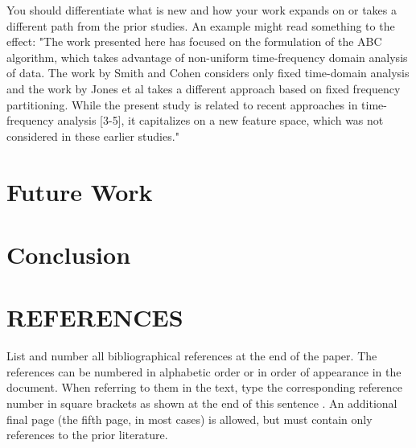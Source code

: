 \documentclass{article}
\begin{document}
You should differentiate what is new and how your work expands on
or takes a different path from the prior studies. An example might
read something to the effect: "The work presented here has focused
on the formulation of the ABC algorithm, which takes advantage of
non-uniform time-frequency domain analysis of data. The work by
Smith and Cohen considers only fixed time-domain analysis and
the work by Jones et al takes a different approach based on
fixed frequency partitioning. While the present study is related
to recent approaches in time-frequency analysis [3-5], it capitalizes
on a new feature space, which was not considered in these earlier
studies."


\section{Future Work}
\label{sec:future}

\section{Conclusion}
\label{sec:future}

\vfill\pagebreak

\section{REFERENCES}
\label{sec:refs}

List and number all bibliographical references at the end of the
paper. The references can be numbered in alphabetic order or in
order of appearance in the document. When referring to them in
the text, type the corresponding reference number in square
brackets as shown at the end of this sentence . An
additional final page (the fifth page, in most cases) is
allowed, but must contain only references to the prior
literature.

\end{document}
